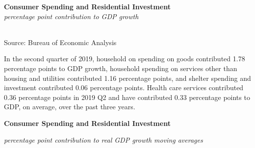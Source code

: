 \documentclass{report}
\makeatletter
\newcommand*\short[1]{\expandafter\@gobbletwo\number\numexpr#1\relax}
\newcommand{\sbar}[4]{
		\addplot[ybar stacked, bar width=2.7pt, draw opacity=0, fill=#1] 
			table [x=#2, y=#3, col sep=comma]{#4};}
\newcommand{\stdnode}[3]{\node[below, align=left, shift=({#1,#2})]{#3};}
\newcommand{\dateaxisticks}{
		date coordinates in=x, axis line style={draw=none},
		xmax={2019-10-01},
		max space between ticks=40,	    
		xtick={{1990-01-01}, {1992-01-01}, {1994-01-01}, 
			{1996-01-01}, {1998-01-01}, {2000-01-01}, 
			{2002-01-01}, {2004-01-01}, {2006-01-01},
			{2008-01-01}, {2010-01-01}, {2012-01-01}, {2014-01-01},
		    {2016-01-01}, {2018-01-01}},
		minor xtick={{1989-01-01}, {1991-01-01}, {1993-01-01},
			{1995-01-01}, {1997-01-01}, {1999-01-01}, 
			{2001-01-01}, {2003-01-01}, {2005-01-01}, {2007-01-01},
		    {2009-01-01}, {2011-01-01}, {2013-01-01}, {2015-01-01},
		    {2017-01-01}, {2019-01-01}},
		enlarge y limits={0.04}, enlarge x limits={0.01},
		}
\newcommand{\bbar}[2]{extra #1 ticks = {{#2}}, extra #1 tick labels = ,
		extra #1 tick style = {grid=major, grid style={thick, black!25}},}
\newcommand{\rbars}{
		\fill[color=black!10] (axis cs:{1990-07-01},\pgfkeysvalueof{/pgfplots/ymin}) rectangle 
			(axis cs:{1991-03-01}, \pgfkeysvalueof{/pgfplots/ymax});
		\fill[color=black!10] (axis cs:{2007-12-01},\pgfkeysvalueof{/pgfplots/ymin}) rectangle 
			(axis cs:{2009-07-01}, \pgfkeysvalueof{/pgfplots/ymax});
		\fill[color=black!10] (axis cs:{2001-03-01},\pgfkeysvalueof{/pgfplots/ymin}) rectangle 
			(axis cs:{2001-11-01}, \pgfkeysvalueof{/pgfplots/ymax});}
\makeatother
\begin{document}
{{\begin{minipage}{0.76\textwidth}
\noindent \normalsize \textbf{Consumer Spending and Residential Investment}\\
\footnotesize{\textit{percentage point contribution to GDP growth}}\\
\noindent \hspace*{-2mm} \\
\footnotesize{Source: Bureau of Economic Analysis}\\

\vspace{2mm}

\small

In the second quarter of 2019, household on spending on goods contributed 1.78 percentage points to GDP growth, household spending on services other than housing and utilities contributed 1.16 percentage points, and shelter spending and investment contributed 0.06 percentage points. Health care services contributed 0.36 percentage points in 2019 Q2 and have contributed 0.33 percentage points to GDP, on average, over the past three years. \\

\end{minipage}

\noindent \normalsize \textbf{Consumer Spending and Residential Investment}\\
\footnotesize{\textit{percentage point contribution to real GDP growth \hspace{36mm} moving averages}\\ \vspace{4mm}
\noindent {} \setlength{\tabcolsep}{3.1pt} \color{black!90}
		{\renewcommand{\arraystretch}{1.55}
		 \begin{tabular}{p{2.0mm} p{38mm} R{6.7mm} R{6.7mm} R{6.7mm} R{6.7mm} R{6.7mm} 
		   R{7.8mm} R{6.7mm} R{6.7mm} }
			 
		\end{tabular}
		}	\\
		
}}}
\end{document}
